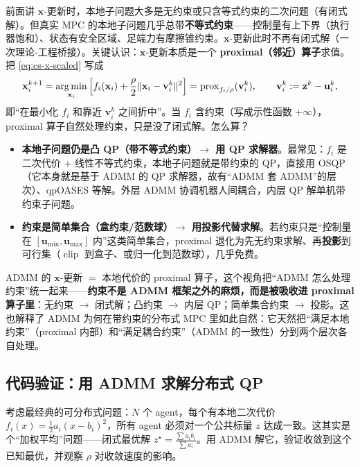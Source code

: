 前面讲 $\mathbf{x}$-更新时，本地子问题大多是无约束或只含等式约束的二次问题（有闭式解）。但真实 MPC 的本地子问题几乎总带\textbf{不等式约束}——控制量有上下界（执行器饱和）、状态有安全区域、足端力有摩擦锥约束。$\mathbf{x}$-更新此时不再有闭式解（一次理论-工程桥接）。关键认识：$\mathbf{x}$-更新本质是一个 \textbf{proximal（邻近）算子}求值。把 \cref{eq:cs-x-scaled} 写成
\begin{equation}
  \mathbf{x}_i^{k+1}=\operatorname*{arg\,min}_{\mathbf{x}_i}\Big[f_i(\mathbf{x}_i)+\frac{\rho}{2}\|\mathbf{x}_i-\mathbf{v}_i^k\|^2\Big]=\operatorname{prox}_{f_i/\rho}(\mathbf{v}_i^k),\qquad \mathbf{v}_i^k:=\mathbf{z}^k-\mathbf{u}_i^k,
  \label{eq:cs-prox}
\end{equation}
即“在最小化 $f_i$ 和靠近 $\mathbf{v}_i^k$ 之间折中”。当 $f_i$ 含约束（写成示性函数 $+\infty$），proximal 算子自然处理约束，只是没了闭式解。怎么算？
\begin{itemize}
  \item \textbf{本地子问题仍是凸 QP（带不等式约束）$\to$ 用 QP 求解器}。最常见：$f_i$ 是二次代价 + 线性不等式约束，本地子问题就是带约束的 QP，直接用 OSQP（它本身就是基于 ADMM 的 QP 求解器，故有“ADMM 套 ADMM”的层次）、qpOASES 等解。外层 ADMM 协调机器人间耦合，内层 QP 解单机带约束子问题。
  \item \textbf{约束是简单集合（盒约束/范数球）$\to$ 用投影代替求解}。若约束只是“控制量在 $[\mathbf{u}_{\min},\mathbf{u}_{\max}]$ 内”这类简单集合，proximal 退化为先无约束求解、再\textbf{投影}到可行集（$\operatorname{clip}$ 到盒子、或归一化到范数球），几乎免费。
\end{itemize}

\begin{insight}\label{ins:cs-prox}
ADMM 的 $\mathbf{x}$-更新 $=$ 本地代价的 proximal 算子，这个视角把“ADMM 怎么处理约束”统一起来——\textbf{约束不是 ADMM 框架之外的麻烦，而是被吸收进 proximal 算子里}：无约束 $\to$ 闭式解；凸约束 $\to$ 内层 QP；简单集合约束 $\to$ 投影。这也解释了 ADMM 为何在带约束的分布式 MPC 里如此自然：它天然把“满足本地约束”（proximal 内部）和“满足耦合约束”（ADMM 的一致性）分到两个层次各自处理。
\end{insight}

\subsection{代码验证：用 ADMM 求解分布式 QP}
\label{sec:cs-admm-code}

考虑最经典的可分布式问题：$N$ 个 agent，每个有本地二次代价 $f_i(x)=\tfrac12 a_i(x-b_i)^2$，所有 agent 必须对一个公共标量 $z$ 达成一致。这其实是个“加权平均”问题——闭式最优解 $z^\star=\tfrac{\sum a_i b_i}{\sum a_i}$。用 ADMM 解它，验证收敛到这个已知最优，并观察 $\rho$ 对收敛速度的影响。

